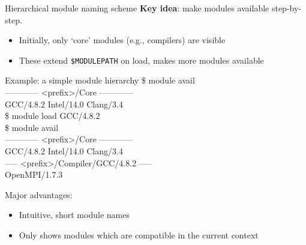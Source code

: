 \documentclass[10pt,xcolor={usenames,dvipsnames}]{beamer}
\begin{document}
\begin{frame}{Hierarchical module naming scheme}
    \textbf{Key idea}: make modules available step-by-step.
    \begin{itemize}
        \item
            Initially, only `core' modules (e.g., compilers) are visible
        \item
            These extend \texttt{\$MODULEPATH} on load, makes
            more modules available
    \end{itemize}
    \quad\quad
    \begin{minipage}{0.9\textwidth}
        \begin{exampleblock}{Example: a simple module hierarchy}
            \ttfamily
            \$ module avail\\
            ------------ <prefix>/Core ------------\\
            GCC/4.8.2 \quad Intel/14.0 \quad Clang/3.4\\
            \$ module load GCC/4.8.2\\
            \$ module avail\\
            ------------ <prefix>/Core ------------\\
            GCC/4.8.2 \quad Intel/14.0 \quad Clang/3.4\\
            ----- <prefix>/Compiler/GCC/4.8.2 -----\\
            OpenMPI/1.7.3
        \end{exampleblock}
    \end{minipage}

    \medskip
    Major advantages:
    \begin{itemize}
        \item
            Intuitive, short module names
        \item
            Only shows modules which are compatible in the current context
    \end{itemize}
\end{frame}

\end{document}
